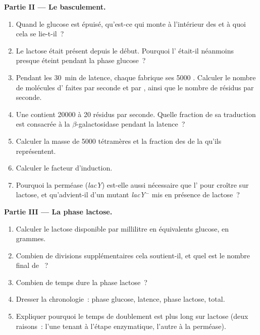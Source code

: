 \begin{problem}
\medskip
\noindent\textbf{Partie II --- Le basculement.}
\begin{enumerate}[resume]
  \item Quand le glucose est épuisé, qu'est-ce qui monte à l'intérieur
        des  et à quoi cela se lie-t-il~?
  \item Le lactose était présent depuis le début. Pourquoi l'
        était-il néanmoins presque éteint pendant la phase glucose~?
  \item Pendant les \qty{30}{min} de latence, chaque  fabrique
        ses \num{5000} . Calculer le nombre de molécules d'
        faites par seconde et par , ainsi que le nombre de
        résidus par seconde.
  \item Une  contient \num{20000}  à \qty{20}{} résidus
        par seconde. Quelle fraction de sa traduction est consacrée à la
        $\beta$-galactosidase pendant la latence~?
  \item Calculer la masse de \num{5000} tétramères et la fraction des
         de la  qu'ils représentent.
  \item Calculer le facteur d'induction.
  \item Pourquoi la perméase (\emph{lacY}) est-elle aussi nécessaire que
        l' pour croître sur lactose, et qu'advient-il d'un mutant
        \emph{lacY}$^-$ mis en présence de lactose~?
\end{enumerate}

\medskip
\noindent\textbf{Partie III --- La phase lactose.}
\begin{enumerate}[resume]
  \item Calculer le lactose disponible par millilitre en équivalents
        glucose, en grammes.
  \item Combien de divisions supplémentaires cela soutient-il, et quel
        est le nombre final de ~?
  \item Combien de temps dure la phase lactose~?
  \item Dresser la chronologie~: phase glucose, latence, phase lactose,
        total.
  \item Expliquer pourquoi le temps de doublement est plus long sur
        lactose (deux raisons~: l'une tenant à l'étape enzymatique,
        l'autre à la perméase).
\end{enumerate}


\end{problem}
